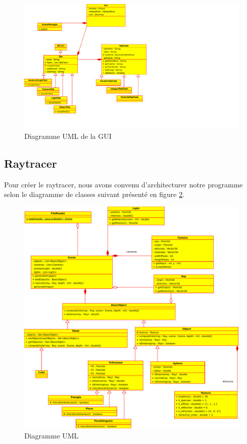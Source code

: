 \documentclass[a4paper]{article}
\begin{document}
    \begin{figure}[p]
      \includegraphics[width=25cm]{guiuml.pdf}
      \caption{Diagramme UML de la GUI\label{fig:guiuml}}
    \end{figure}

  \subsection{Raytracer}
    Pour créer le raytracer, nous avons convenu d'architecturer notre programme
    selon le diagramme de classes suivant présenté en figure \ref{fig:uml}.

    \begin{figure}[p]
      \includegraphics[width=\textwidth]{uml.pdf}
      \caption{Diagramme UML\label{fig:uml}}
    \end{figure}
\end{document}
